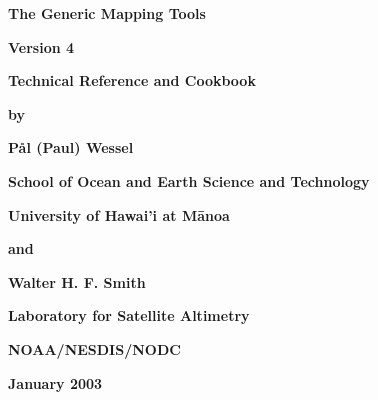 %
%

\thispagestyle{empty}

\begin{center}
\huge
\textbf{The Generic Mapping Tools}\par 
\vspace{0.5\baselineskip}


\Huge
\textbf{Version 4}\par 
\vspace{0.25\baselineskip}

\huge
\textbf{Technical Reference and Cookbook}\par 

\large
\vspace{0.75\baselineskip}
\textbf{by}\par 
\vspace{0.75\baselineskip}

\huge
\textbf{P\aa l (Paul) Wessel}\par 
\vspace{0.5\baselineskip}

\Large
\textbf{School of Ocean and Earth Science and Technology}\par 
\textbf{University of Hawai'i at M\={a}noa}\par 

\large
\vspace{0.75\baselineskip}
\textbf{and}\par 
\vspace{0.75\baselineskip}

\huge
\textbf{Walter H. F. Smith}\par 
\vspace{0.5\baselineskip}

\Large
\textbf{Laboratory for Satellite Altimetry}\par 
\textbf{NOAA/NESDIS/NODC}\par 
\vspace{0.5\baselineskip}

\large
\textbf{January 2003}\par 
\vspace{\baselineskip}

\end{center}
